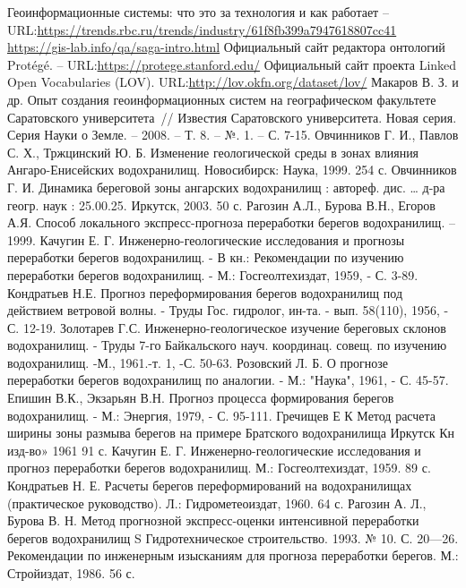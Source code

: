 \documentclass[732,14pt,final]{studrep}
\begin{document}
\begin{thebibliography}{99}
 Геоинформационные системы: что это за технология и как работает -- URL:\url{https://trends.rbc.ru/trends/industry/61f8fb399a7947618807cc41}
\url{https://gis-lab.info/qa/saga-intro.html}
 Официальный сайт редактора онтологий Protégé. -- URL:\url{https://protege.stanford.edu/}
 Официальный сайт проекта Linked Open Vocabularies (LOV). URL:\url{http://lov.okfn.org/dataset/lov/}
 Макаров В. З. и др. Опыт создания геоинформационных систем на географическом факультете Саратовского университета~// Известия Саратовского университета. Новая серия. Серия Науки о Земле. – 2008. – Т. 8. – №. 1. – С. 7-15.
Овчинников Г. И., Павлов С. Х., Тржцинский Ю. Б. Изменение геологической среды в зонах влияния Ангаро-Енисейских водохранилищ. Новосибирск: Наука, 1999. 254 с.
Овчинников Г. И. Динамика береговой зоны ангарских водохранилищ : автореф. дис. … д-ра геогр. наук : 25.00.25. Иркутск, 2003. 50 с.
Рагозин А.Л., Бурова В.Н., Егоров А.Я. Способ локального экспресс-прогноза переработки берегов водохранилищ. – 1999.
Качугин Е. Г. Инженерно-геологические исследования и прогнозы переработки берегов водохранилищ. - В кн.: Рекомендации по изучению переработки берегов водохранилищ. - М.: Госгеолтехиздат, 1959, - С. 3-89.
Кондратьев Н.Е. Прогноз переформирования берегов водохранилищ под действием ветровой волны. - Труды Гос. гидролог, ин-та. - вып. 58(110), 1956, - С. 12-19.
Золотарев Г.С. Инженерно-геологическое изучение береговых склонов водохранилищ. - Труды 7-го Байкальского науч. координац. совещ. по изучению водохранилищ. -М., 1961.-т. 1, -С. 50-63.
Розовский Л. Б. О прогнозе переработки берегов водохранилищ по аналогии. - М.: "Наука", 1961, - С. 45-57.
Епишин В.К., Экзарьян В.Н. Прогноз процесса формирования берегов водохранилищ. - М.: Энергия, 1979, - С. 95-111.
Гречищев Е К Метод расчета ширины зоны размыва берегов на примере Братского водохранилища Иркутск Кн изд-во» 1961 91 с.
Качугин Е. Г. Инженерно-геологические исследования и прогноз переработки берегов водохранилищ. М.: Госгеолтехиздат, 1959. 89 с.
Кондратьев Н. Е. Расчеты берегов переформирований на водохранилищах (практическое руководство). Л.: Гидрометеоиздат, 1960. 64 с.
Рагозин А. Л., Бурова В. Н. Метод прогнозной экспресс-оценки интенсивной переработки берегов водохранилищ S Гидротехническое строительство. 1993. № 10. С. 20—26.
Рекомендации по инженерным изысканиям для прогноза переработки берегов. М.: Стройиздат, 1986. 56 с.

\end{thebibliography}
\end{document}
